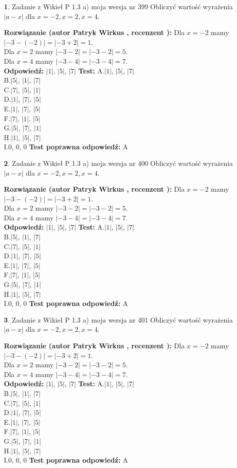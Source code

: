 \documentclass[12pt, a4paper]{article}
\theoremstyle{definition} %
\newtheorem{zad}{}
\newcommand{\zadStart}[1]{\begin{zad}#1\newline}
\newcommand{\zadStop}{\end{zad}}
\newcommand{\rozwStart}[2]{\noindent \textbf{Rozwiązanie (autor #1 , recenzent #2): }\newline}
\newcommand{\rozwStop}{\newline}
\newcommand{\odpStart}{\noindent \textbf{Odpowiedź:}\newline}
\newcommand{\odpStop}{\newline}
\newcommand{\testStart}{\noindent \textbf{Test:}\newline}
\newcommand{\testStop}{\newline}
\newcommand{\kluczStart}{\noindent \textbf{Test poprawna odpowiedź:}\newline}
\newcommand{\kluczStop}{\newline}
\begin{document}
\zadStart{Zadanie z Wikieł P 1.3 a) moja wersja nr 399}
Obliczyć wartość wyrażenia $|a - x|$ dla $x=-2,x=2,x=4$.
\zadStop
\rozwStart{Patryk Wirkus}{}
Dla $x = -2$ mamy $|-3 - (-2)| = |-3 + 2| = 1$.\\
Dla $x = 2$ mamy $|-3 - 2| = |-3 - 2| = 5$.\\
Dla $x = 4$ mamy $|-3 - 4| = |-3 - 4| = 7$.\\
\rozwStop
\odpStart
$|1|$, $|5|$, $|7|$
\odpStop
\testStart
A.$|1|$, $|5|$, $|7|$\\
B.$|5|$, $|1|$, $|7|$\\
C.$|7|$, $|5|$, $|1|$\\
D.$|1|$, $|7|$, $|5|$\\
E.$|1|$, $|7|$, $|5|$\\
F.$|7|$, $|1|$, $|5|$\\
G.$|5|$, $|7|$, $|1|$\\
H.$|1|$, $|5|$, $|7|$\\
I.$0$, $0$, $0$
\testStop
\kluczStart
A
\kluczStop



\zadStart{Zadanie z Wikieł P 1.3 a) moja wersja nr 400}
Obliczyć wartość wyrażenia $|a - x|$ dla $x=-2,x=2,x=4$.
\zadStop
\rozwStart{Patryk Wirkus}{}
Dla $x = -2$ mamy $|-3 - (-2)| = |-3 + 2| = 1$.\\
Dla $x = 2$ mamy $|-3 - 2| = |-3 - 2| = 5$.\\
Dla $x = 4$ mamy $|-3 - 4| = |-3 - 4| = 7$.\\
\rozwStop
\odpStart
$|1|$, $|5|$, $|7|$
\odpStop
\testStart
A.$|1|$, $|5|$, $|7|$\\
B.$|5|$, $|1|$, $|7|$\\
C.$|7|$, $|5|$, $|1|$\\
D.$|1|$, $|7|$, $|5|$\\
E.$|1|$, $|7|$, $|5|$\\
F.$|7|$, $|1|$, $|5|$\\
G.$|5|$, $|7|$, $|1|$\\
H.$|1|$, $|5|$, $|7|$\\
I.$0$, $0$, $0$
\testStop
\kluczStart
A
\kluczStop



\zadStart{Zadanie z Wikieł P 1.3 a) moja wersja nr 401}
Obliczyć wartość wyrażenia $|a - x|$ dla $x=-2,x=2,x=4$.
\zadStop
\rozwStart{Patryk Wirkus}{}
Dla $x = -2$ mamy $|-3 - (-2)| = |-3 + 2| = 1$.\\
Dla $x = 2$ mamy $|-3 - 2| = |-3 - 2| = 5$.\\
Dla $x = 4$ mamy $|-3 - 4| = |-3 - 4| = 7$.\\
\rozwStop
\odpStart
$|1|$, $|5|$, $|7|$
\odpStop
\testStart
A.$|1|$, $|5|$, $|7|$\\
B.$|5|$, $|1|$, $|7|$\\
C.$|7|$, $|5|$, $|1|$\\
D.$|1|$, $|7|$, $|5|$\\
E.$|1|$, $|7|$, $|5|$\\
F.$|7|$, $|1|$, $|5|$\\
G.$|5|$, $|7|$, $|1|$\\
H.$|1|$, $|5|$, $|7|$\\
I.$0$, $0$, $0$
\testStop
\kluczStart
A
\kluczStop
\end{document}
